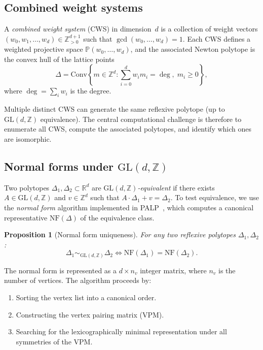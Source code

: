 \documentclass[12pt,a4paper]{article}
\newtheorem{proposition}[theorem]{Proposition}
\theoremstyle{definition}
\newcommand{\ZZ}{\mathbb{Z}}
\newcommand{\RR}{\mathbb{R}}
\newcommand{\GL}{\mathrm{GL}}
\newcommand{\NF}{\mathrm{NF}}
\begin{document}
\subsection{Combined weight systems}

A \emph{combined weight system} (CWS) in dimension~$d$ is a collection
of weight vectors $(w_0, w_1, \ldots, w_d) \in \ZZ_{>0}^{d+1}$ such
that $\gcd(w_0, \ldots, w_d) = 1$.  Each CWS defines a weighted
projective space $\mathbb{P}(w_0, \ldots, w_d)$, and the associated
Newton polytope is the convex hull of the lattice points
\[
  \Delta = \mathrm{Conv}\left\{
    m \in \ZZ^d : \sum_{i=0}^{d} w_i m_i = \deg,\;
    m_i \geq 0
  \right\},
\]
where $\deg = \sum_i w_i$ is the degree.

Multiple distinct CWS can generate the same reflexive polytope (up to
$\GL(d,\ZZ)$ equivalence).  The central computational challenge is
therefore to enumerate all CWS, compute the associated polytopes, and
identify which ones are isomorphic.

\subsection{Normal forms under $\GL(d,\ZZ)$}

Two polytopes $\Delta_1, \Delta_2 \subset \RR^d$ are
\emph{$\GL(d,\ZZ)$-equivalent} if there exists $A \in \GL(d,\ZZ)$ and
$v \in \ZZ^d$ such that $A \cdot \Delta_1 + v = \Delta_2$.  To test
equivalence, we use the \emph{normal form} algorithm implemented in
PALP~\cite{PALP}, which computes a canonical representative $\NF(\Delta)$
of the equivalence class.

\begin{proposition}[Normal form uniqueness]
For any two reflexive polytopes $\Delta_1, \Delta_2$:
\[
  \Delta_1 \sim_{\GL(d,\ZZ)} \Delta_2
  \iff
  \NF(\Delta_1) = \NF(\Delta_2).
\]
\end{proposition}

The normal form is represented as a $d \times n_v$ integer matrix, where
$n_v$ is the number of vertices.  The algorithm proceeds by:
\begin{enumerate}
  \item Sorting the vertex list into a canonical order.
  \item Constructing the vertex pairing matrix (VPM).
  \item Searching for the lexicographically minimal representation under
        all symmetries of the VPM.
\end{enumerate}
\end{document}

